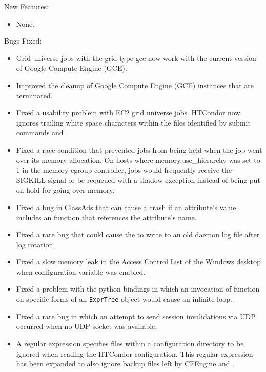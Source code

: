 \noindent New Features:

\begin{itemize}

\item None.

\end{itemize}

\noindent Bugs Fixed:

\begin{itemize}

\item Grid universe jobs with the grid type gce now
work with the current version of Google Compute Engine (GCE).

\item Improved the cleanup of Google Compute Engine (GCE) instances that
are terminated.

\item Fixed a usability problem with EC2 grid universe jobs.
HTCondor now ignores trailing white space characters within the files
identified by submit commands 
and .

\item Fixed a race condition that prevented jobs from being held when
the job went over its memory allocation.  On hosts where memory.use\_hierarchy
was set to 1 in the memory cgroup controller, jobs would frequently receive
the SIGKILL signal or be requeued with a shadow exception instead of
being put on hold for going over memory. 

\item Fixed a bug in ClassAds that can cause a crash if an attribute's
value includes an  function that references the attribute's
name.

\item Fixed a rare bug that could cause the  to write to an
old daemon log file after log rotation.

\item Fixed a slow memory leak in the Access Control List of the 
Windows desktop when configuration variable
 was enabled.

\item Fixed a problem with the python bindings in which an
invocation of function 
on specific forms of an \texttt{ExprTree} object would cause an infinite loop.

\item Fixed a rare bug in which an attempt to send session invalidations 
via UDP occurred when no UDP socket was available.

\item A regular expression specifies files within a configuration directory 
to be ignored when reading the HTCondor configuration.
This regular expression has been expanded to also
ignore backup files left by CFEngine and .

\end{itemize}

